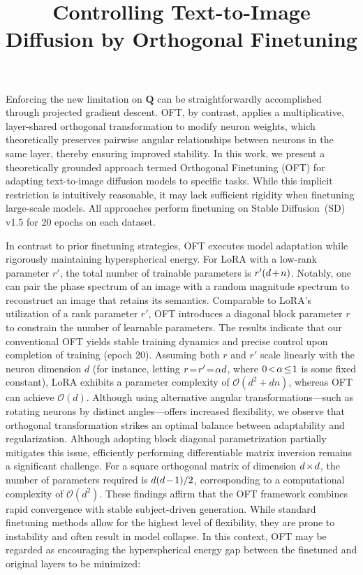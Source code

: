 \title{Controlling Text-to-Image Diffusion by Orthogonal Finetuning}
Enforcing the new limitation on $\bm{Q}$ can be straightforwardly accomplished through projected gradient descent. OFT, by contrast, applies a multiplicative, layer-shared orthogonal transformation to modify neuron weights, which theoretically preserves pairwise angular relationships between neurons in the same layer, thereby ensuring improved stability. In this work, we present a theoretically grounded approach termed Orthogonal Finetuning (OFT) for adapting text-to-image diffusion models to specific tasks. While this implicit restriction is intuitively reasonable, it may lack sufficient rigidity when finetuning large-scale models. All approaches perform finetuning on Stable Diffusion~(SD) v1.5 for 20 epochs on each dataset. \item In contrast to prior finetuning strategies, OFT executes model adaptation while rigorously maintaining hyperspherical energy. For LoRA with a low-rank parameter $r'$, the total number of trainable parameters is $\thickmuskip=2mu \medmuskip=2mu r'(d+n)$. Notably, one can pair the phase spectrum of an image with a random magnitude spectrum to reconstruct an image that retains its semantics. Comparable to LoRA’s utilization of a rank parameter $r'$, OFT introduces a diagonal block parameter $r$ to constrain the number of learnable parameters. The results indicate that our conventional OFT yields stable training dynamics and precise control upon completion of training (epoch 20). Assuming both $r$ and $r'$ scale linearly with the neuron dimension $d$ (for instance, letting $\thickmuskip=2mu \medmuskip=2mu r=r'=\alpha d$, where $\thickmuskip=2mu \medmuskip=2mu 0<\alpha\leq 1$ is some fixed constant), LoRA exhibits a parameter complexity of $\mathcal{O}(d^2+dn)$, whereas OFT can achieve $\mathcal{O}(d)$. Although using alternative angular transformations—such as rotating neurons by distinct angles—offers increased flexibility, we observe that orthogonal transformation strikes an optimal balance between adaptability and regularization. Although adopting block diagonal parametrization partially mitigates this issue, efficiently performing differentiable matrix inversion remains a significant challenge. For a square orthogonal matrix of dimension $\thickmuskip=2mu \medmuskip=2mu d\times d$, the number of parameters required is $\thickmuskip=2mu \medmuskip=2mu d(d-1)/2$, corresponding to a computational complexity of $\mathcal{O}(d^2)$. These findings affirm that the OFT framework combines rapid convergence with stable subject-driven generation. While standard finetuning methods allow for the highest level of flexibility, they are prone to instability and often result in model collapse. In this context, OFT may be regarded as encouraging the hyperspherical energy gap between the finetuned and original layers to be minimized:

